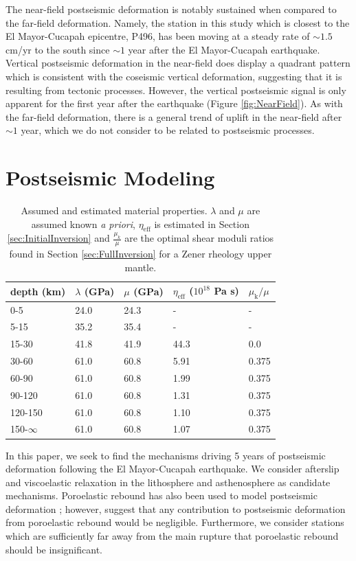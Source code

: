 \documentclass[review]{elsarticle}
\begin{document}
The near-field postseismic deformation is notably sustained when compared to the far-field deformation.  Namely, the station in this study which is closest to the El Mayor-Cucapah epicentre, P496, has been moving at a steady rate of $\sim1.5$ cm/yr to the south since $\sim1$ year after the El Mayor-Cucapah earthquake.  Vertical postseismic deformation in the near-field does display a quadrant pattern which is consistent with the coseismic vertical deformation, suggesting that it is resulting from tectonic processes.  However, the vertical postseismic signal is only apparent for the first year after the earthquake (Figure \ref{fig:NearField}).  As with the far-field deformation, there is a general trend of uplift in the near-field after $\sim1$ year, which we do not consider to be related to postseismic processes.  

\section{Postseismic Modeling}\label{sec:Model}

\begin{table}\label{tab:MaterialProperties}
\begin{tabular} {l l l l l}
depth (km) &$\lambda$ (GPa)&$\mu$ (GPa)&$\eta_\mathrm{eff}$ ($10^{18}$ Pa s) & $\mu_\mathrm{k}/\mu$\\ \hline
0-5 & 24.0 & 24.3 & - & -\\
5-15 & 35.2 & 35.4 & - & -\\
15-30 & 41.8 & 41.9 & 44.3 & 0.0\\
30-60 & 61.0 & 60.8 & 5.91 & 0.375\\
60-90 & 61.0 & 60.8 & 1.99 & 0.375\\
90-120 & 61.0 & 60.8 & 1.31 & 0.375\\
120-150 & 61.0 & 60.8 & 1.10 & 0.375\\
150-$\infty$ & 61.0 & 60.8 & 1.07 & 0.375\\
\end{tabular}
\caption{Assumed and estimated material properties. $\lambda$ and $\mu$ are assumed known \textit{a priori}, $\eta_\mathrm{eff}$ is estimated in Section \ref{sec:InitialInversion} and $\frac{\mu_k}{\mu}$ are the optimal shear moduli ratios found in Section \ref{sec:FullInversion} for a Zener rheology upper mantle.} 

\end{table}
In this paper, we seek to find the mechanisms driving 5 years of postseismic deformation following the El Mayor-Cucapah earthquake. We consider afterslip and viscoelastic relaxation in the lithosphere and asthenosphere as candidate mechanisms.  Poroelastic rebound has also been used to model postseismic deformation \citep[e.g.][]{Jonsson2003}; however, \citet{Gonzalez-ortega2014} suggest that any contribution to postseismic deformation from poroelastic rebound would be negligible. Furthermore, we consider stations which are sufficiently far away from the main rupture that poroelastic rebound should be insignificant.  
\end{document}
